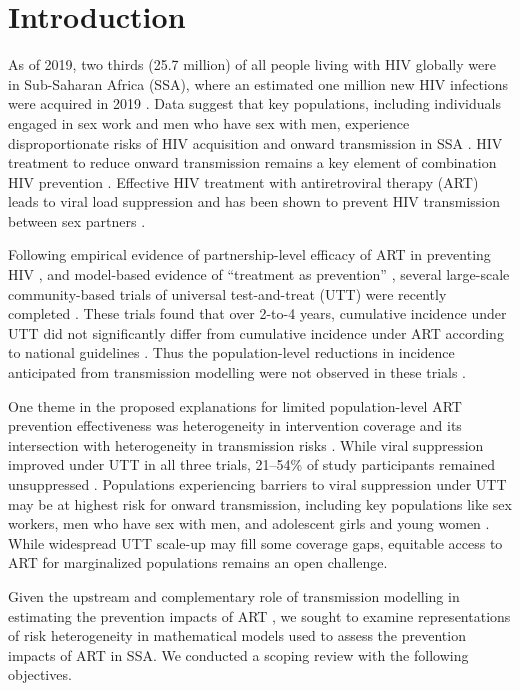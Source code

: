 \section{Introduction}
\label{s:intro}
As of 2019, two thirds (25.7 million) of all people living with HIV globally
were in Sub-Saharan Africa (SSA), where
an estimated one million new HIV infections were acquired in 2019 \cite{AIDSinfo}.
Data suggest that key populations, including individuals engaged in sex work and men who have sex with men,
experience disproportionate risks of HIV acquisition and onward transmission in SSA
\cite{Baral2012,Beyrer2012,Mishra2012,Boily2015}.
HIV treatment to reduce onward transmission remains a key element of combination HIV prevention \cite{WHO2016ART}.
Effective HIV treatment with antiretroviral therapy (ART) leads to viral load suppression
and has been shown to prevent HIV transmission between sex partners \cite{Lundgren2015,Danel2015,Cohen2016}.
\par
Following empirical evidence of partnership-level efficacy of ART
in preventing HIV \cite{Lundgren2015,Danel2015,Cohen2016},
and model-based evidence of ``treatment as prevention'' \cite{Granich2009,Eaton2012,Cori2014},
several large-scale community-based trials of universal test-and-treat (UTT)
were recently completed \cite{Iwuji2018,Havlir2019,Hayes2019}.
These trials found that over 2-to-4 years,
cumulative incidence under UTT did not significantly differ from
cumulative incidence under ART according to national guidelines \cite{Havlir2019,Hayes2019,Iwuji2018}.
Thus the population-level reductions in incidence anticipated from transmission modelling
were not observed in these trials \cite{Baral2019,Havlir2020}.
\par
One theme in the proposed explanations for limited population-level ART prevention effectiveness
was heterogeneity in intervention coverage and its intersection with
heterogeneity in transmission risks \cite{AbdoolKarim2019,Baral2019}.
While viral suppression improved under UTT in all three trials,
21--54\% of study participants remained unsuppressed \cite{Iwuji2018,Havlir2019,Hayes2019}.
Populations experiencing barriers to viral suppression under UTT
may be at highest risk for onward transmission, including key populations like
sex workers, men who have sex with men, and adolescent girls and young women
\cite{Hakim2018,Nyato2019,Green2020}.
While widespread UTT scale-up may fill some coverage gaps,
equitable access to ART for marginalized populations remains an open challenge.
\par
Given the upstream and complementary role of transmission modelling
in estimating the prevention impacts of ART \cite{Eaton2012,Delva2012},
we sought to examine representations of risk heterogeneity
in mathematical models used to assess the prevention impacts of ART in SSA.
We conducted a scoping review with the following objectives.

